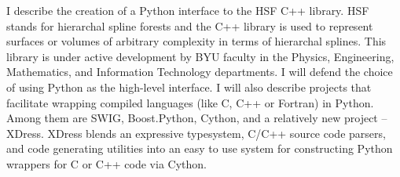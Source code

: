 I describe the creation of a Python interface to the HSF C++ library. HSF stands for hierarchal spline forests and the C++ library is used to represent surfaces or volumes of arbitrary complexity in terms of hierarchal splines. This library is under active development by BYU faculty in the Physics, Engineering, Mathematics, and Information Technology departments. I will defend the choice of using Python as the high-level interface. I will also describe projects that facilitate wrapping compiled languages (like C, C++ or Fortran) in Python. Among them are SWIG, Boost.Python, Cython, and a relatively new project -- XDress. XDress blends an expressive typesystem, C/C++ source code parsers, and code generating utilities into an easy to use system for constructing Python wrappers for C or C++ code via Cython.
